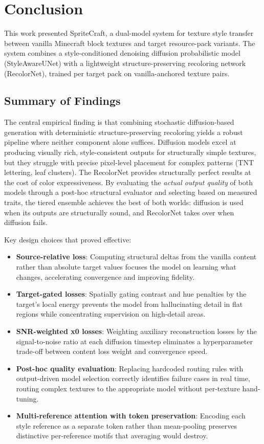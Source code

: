 \chapter{Conclusion}
\label{chap:conclusion}

This work presented SpriteCraft, a dual-model system for texture style transfer between vanilla Minecraft block textures and target resource-pack variants. The system combines a style-conditioned denoising diffusion probabilistic model (StyleAwareUNet) with a lightweight structure-preserving recoloring network (RecolorNet), trained per target pack on vanilla-anchored texture pairs.

\section{Summary of Findings}

The central empirical finding is that combining stochastic diffusion-based generation with deterministic structure-preserving recoloring yields a robust pipeline where neither component alone suffices. Diffusion models excel at producing visually rich, style-consistent outputs for structurally simple textures, but they struggle with precise pixel-level placement for complex patterns (TNT lettering, leaf clusters). The RecolorNet provides structurally perfect results at the cost of color expressiveness. By evaluating the \emph{actual output quality} of both models through a post-hoc structural evaluator and selecting based on measured traits, the tiered ensemble achieves the best of both worlds: diffusion is used when its outputs are structurally sound, and RecolorNet takes over when diffusion fails.

Key design choices that proved effective:
\begin{itemize}
    \item \textbf{Source-relative loss}: Computing structural deltas from the vanilla content rather than absolute target values focuses the model on learning what changes, accelerating convergence and improving fidelity.
    \item \textbf{Target-gated losses}: Spatially gating contrast and hue penalties by the target's local energy prevents the model from hallucinating detail in flat regions while concentrating supervision on high-detail areas.
    \item \textbf{SNR-weighted x0 losses}: Weighting auxiliary reconstruction losses by the signal-to-noise ratio at each diffusion timestep eliminates a hyperparameter trade-off between content loss weight and convergence speed.
    \item \textbf{Post-hoc quality evaluation}: Replacing hardcoded routing rules with output-driven model selection correctly identifies failure cases in real time, routing complex textures to the appropriate model without per-texture hand-tuning.
    \item \textbf{Multi-reference attention with token preservation}: Encoding each style reference as a separate token rather than mean-pooling preserves distinctive per-reference motifs that averaging would destroy.
\end{itemize}

